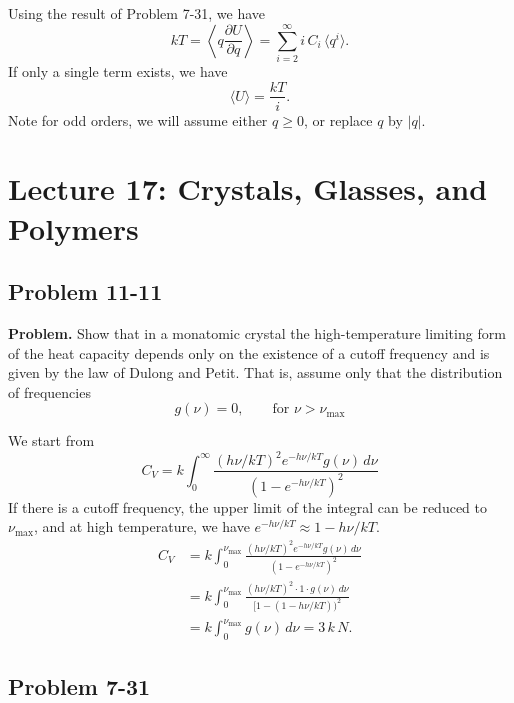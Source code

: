 \documentclass[twocolumn, 10pt]{article}
\numberwithin{equation}{section}
\newenvironment{problem}
{\par\medskip \color{problemblue}
  \textbf{Problem. }\ignorespaces}
{\medskip}
\newenvironment{solution}[1][\empty]
{\par\medskip\sffamily
  \textbf{\ifx\empty#1{Solution.}\relax\else{#1}\fi} \ignorespaces}
{\medskip}
\begin{document}
\begin{solution}
Using the result of Problem 7-31, we have
$$
kT
=
\left\langle
  q \frac{ \partial U } { \partial q }
\right\rangle
=
\sum_{i = 2}^\infty
  i \, C_i \, \langle q^i \rangle
.
$$
If only a single term exists, we have
$$
  \langle U \rangle = \frac{kT}{i}.
$$
Note for odd orders, we will assume either $q \ge 0$,
or replace $q$ by $|q|$.
\end{solution}

\section{Lecture 17: Crystals, Glasses, and Polymers}

\subsection{Problem 11-11}

\begin{problem}
  Show that in a monatomic crystal the high-temperature limiting form
  of the heat capacity depends only on the existence of a cutoff frequency
  and is given by the law of Dulong and Petit.
  That is, assume only that the distribution of frequencies
  $$
  g(\nu) = 0, \qquad \mbox{for $\nu > \nu_\mathrm{max}$}
  $$
\end{problem}

\begin{solution}
  We start from
  \begin{equation}
    C_V = k
    \int_0^\infty
      \frac{ (h\nu/kT)^2 e^{-h\nu/kT} g(\nu) \, d\nu }
           { (1 - e^{-h\nu/kT})^2 }
    \tag{11-10}
  \end{equation}
  If there is a cutoff frequency, the upper limit of the integral
  can be reduced to $\nu_\mathrm{max}$, and
  at high temperature,
  we have $e^{-h\nu/kT} \approx 1 - h\nu/kT$.
  \begin{align*}
    C_V
    &= k
    \int_0^{\nu_\mathrm{max}}
      \frac{ (h\nu/kT)^2 e^{-h\nu/kT} g(\nu) \, d\nu }
           { (1 - e^{-h\nu/kT})^2 }
    \\
    &= k
    \int_0^{\nu_\mathrm{max}}
      \frac{ (h\nu/kT)^2 \cdot 1 \cdot g(\nu) \, d\nu }
           { [1 - (1-h\nu/kT))^2 }
    \\
    &= k \int_0^{\nu_\mathrm{max}} g(\nu) \, d\nu
    = 3 \, k \, N.
  \end{align*}
\end{solution}

\subsection{Problem 7-31}
\end{document}
